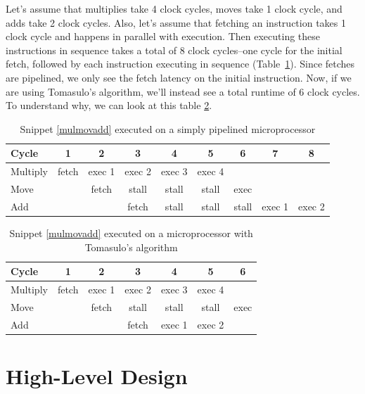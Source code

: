 \documentclass[12pt]{article}
\begin{document}
Let's assume that multiplies take 4 clock cycles, moves take 1 clock cycle,
and adds take 2 clock cycles. Also, let's assume that fetching an instruction
takes 1 clock cycle and happens in parallel with execution. Then executing
these instructions in sequence takes a total of 8 clock cycles--one cycle for
the initial fetch, followed by each instruction executing in sequence
(Table~\ref{tab:simpleex1}). Since fetches are pipelined, we only see the
fetch latency on the initial instruction. Now, if we are using Tomasulo's
algorithm, we'll instead see a total runtime of 6 clock cycles. To understand
why, we can look at this table \ref{tab:tomasuloex1}.

\begin{table}
\begin{tabular}{l || c | c | c | c | c | c | c | c}
Cycle & 1 & 2 & 3 & 4 & 5 & 6  & 7 & 8 \\ \hline
Multiply & fetch & exec 1 & exec 2 & exec 3 & exec 4 & & \\
Move & & fetch & stall & stall & stall & exec & \\
Add & & & fetch & stall & stall & stall & exec 1 & exec 2 \\
\end {tabular}
\caption{Snippet \ref{mulmovadd} executed on a simply pipelined microprocessor}
\label{tab:simpleex1}
\end{table}

\begin{table}
\begin{tabular}{l || c | c | c | c | c | c}
Cycle & 1 & 2 & 3 & 4 & 5 & 6 \\ \hline
Multiply & fetch & exec 1 & exec 2 & exec 3 & exec 4 & \\
Move & & fetch & stall & stall & stall & exec \\
Add & & & fetch & exec 1 & exec 2 & \\
\end {tabular}
\caption{Snippet \ref{mulmovadd} executed on a microprocessor with Tomasulo's algorithm}
\label{tab:tomasuloex1}
\end{table}

\section{High-Level Design}
\end{document}
